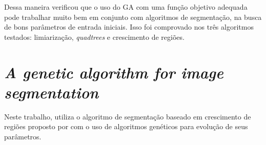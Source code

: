 \documentclass[12pt,oneside,a4paper,english,french,spanish,brazil,]{abntex2}
\begin{document}
Dessa maneira \citet{matias:2007} verificou que o uso do GA com uma função objetivo adequada pode trabalhar muito bem em conjunto com algoritmos de segmentação, na busca de bons parâmetros de entrada iniciais. Isso foi comprovado nos três algoritmos testados: limiarização, \textit{quadtrees} e crescimento de regiões.

\section{\textit{A genetic algorithm for image segmentation}}


Neste trabalho, \citet{bosco:2001} utiliza o algoritmo de segmentação baseado em crescimento de regiões proposto por \citet{gesu:1988} com o uso de algoritmos genéticos para evolução de seus parâmetros. 
\end{document}
